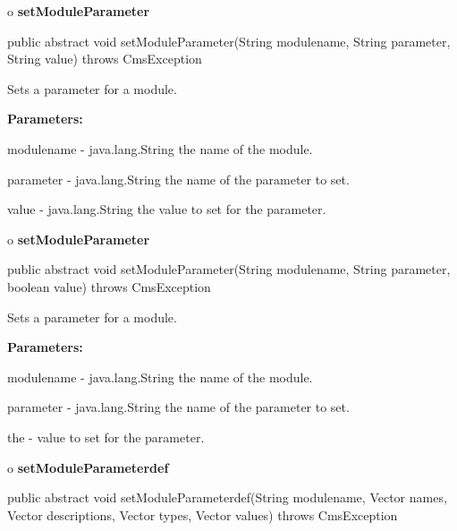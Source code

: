 o {\bf setModuleParameter} 

\begin{PRE}
 public abstract void setModuleParameter(String modulename,
                                         String parameter,
                                         String value) throws CmsException
\end{PRE}

\begin{description}
\htmlDD Sets a parameter for a module. 

\begin{description}
\item {\bf Parameters:}  

modulename - java.lang.String the name of the module.  

parameter - java.lang.String the name of the parameter to set.  

value - java.lang.String the value to set for the parameter.  
\end{description}

\end{description}

o {\bf setModuleParameter} 

\begin{PRE}
 public abstract void setModuleParameter(String modulename,
                                         String parameter,
                                         boolean value) throws CmsException
\end{PRE}

\begin{description}
\htmlDD Sets a parameter for a module. 

\begin{description}
\item {\bf Parameters:}  

modulename - java.lang.String the name of the module.  

parameter - java.lang.String the name of the parameter to set.  

the - value to set for the parameter.  
\end{description}

\end{description}

o {\bf setModuleParameterdef} 

\begin{PRE}
 public abstract void setModuleParameterdef(String modulename,
                                            Vector names,
                                            Vector descriptions,
                                            Vector types,
                                            Vector values) throws CmsException
\end{PRE}

